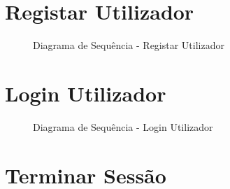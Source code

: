 \documentclass[a4paper,12pt]{scrreprt}
\begin{document}
\clearpage

\section{Registar Utilizador}

\begin{figure}[hbt!]
    \centering
    \caption{Diagrama de Sequência - Registar Utilizador}
\end{figure}


\section{Login Utilizador}
\begin{figure}[hbt!]
    \centering
    \caption{Diagrama de Sequência - Login Utilizador}
\end{figure}

\clearpage

\section{Terminar Sessão}
\end{document}
